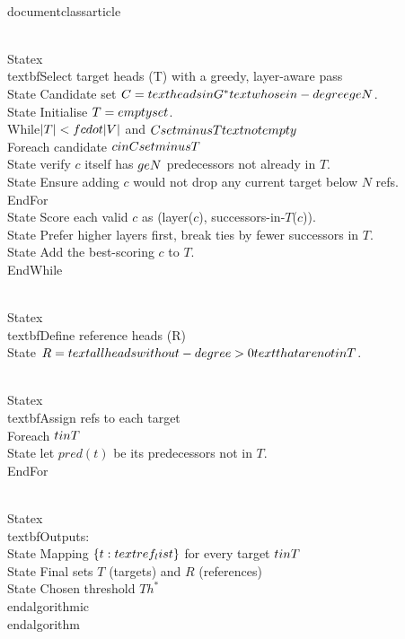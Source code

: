\\documentclass{article}
\begin{document}
\\Statex \\textbf{Select target heads (T) with a greedy, layer-aware pass}
\\State Candidate set $C = \\text{heads in } G^* \\text{ whose in-degree } \\ge N$.
\\State Initialise $T = \\emptyset$.
\\While{$|T| < f \\cdot |V|$ and $C \\setminus T \\text{ not empty}$}
    \\For{each candidate $c \\in C \\setminus T$}
        \\State verify $c$ itself has $\\ge N$ predecessors not already in $T$.
        \\State Ensure adding $c$ would not drop any current target below $N$ refs.
    \\EndFor
    \\State Score each valid $c$ as (layer($c$), successors-in-$T$($c$)).
    \\State Prefer higher layers first, break ties by fewer successors in $T$.
    \\State Add the best-scoring $c$ to $T$.
\\EndWhile

\\Statex \\textbf{Define reference heads (R)}
\\State $R = \\text{all heads with out-degree} > 0 \\text{ that are not in } T$.

\\Statex \\textbf{Assign refs to each target}
\\For{each $t \\in T$}
    \\State let $pred(t)$ be its predecessors not in $T$.
\\EndFor

\\Statex \\textbf{Outputs:}
\\State Mapping $\{t: \\text{ref_list}\}$ for every target $t \\in T$
\\State Final sets $T$ (targets) and $R$ (references)
\\State Chosen threshold $Th^*$
\\end{algorithmic}
\\end{algorithm}

\
\end{document}
